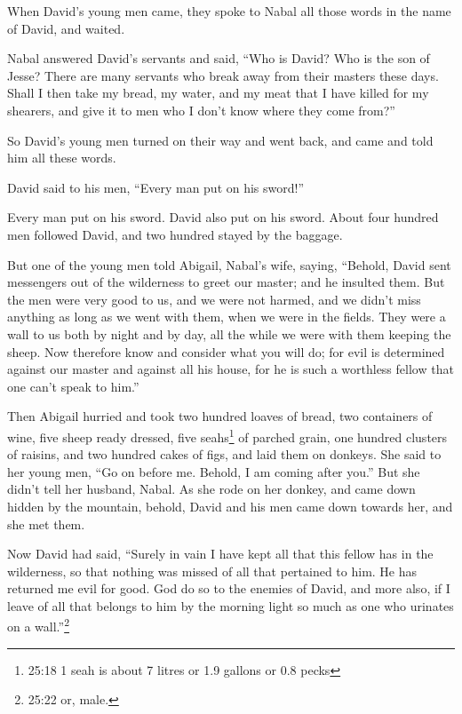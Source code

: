  When David's young men came, they spoke to Nabal all those
words in the name of David, and waited.

 Nabal answered David's servants and said, ``Who is David?
Who is the son of Jesse? There are many servants who break away from
their masters these days.  Shall I then take my bread, my
water, and my meat that I have killed for my shearers, and give it to
men who I don't know where they come from?''

 So David's young men turned on their way and went back,
and came and told him all these words.

 David said to his men, ``Every man put on his sword!''

Every man put on his sword. David also put on his sword. About four
hundred men followed David, and two hundred stayed by the baggage.

 But one of the young men told Abigail, Nabal's wife,
saying, ``Behold, David sent messengers out of the wilderness to greet
our master; and he insulted them.  But the men were very
good to us, and we were not harmed, and we didn't miss anything as long
as we went with them, when we were in the fields.  They
were a wall to us both by night and by day, all the while we were with
them keeping the sheep.  Now therefore know and consider
what you will do; for evil is determined against our master and against
all his house, for he is such a worthless fellow that one can't speak to
him.''

 Then Abigail hurried and took two hundred loaves of bread,
two containers of wine, five sheep ready dressed, five seahs\footnote{25:18
  1 seah is about 7 litres or 1.9 gallons or 0.8 pecks} of parched
grain, one hundred clusters of raisins, and two hundred cakes of figs,
and laid them on donkeys.  She said to her young men, ``Go
on before me. Behold, I am coming after you.'' But she didn't tell her
husband, Nabal.  As she rode on her donkey, and came down
hidden by the mountain, behold, David and his men came down towards her,
and she met them.

 Now David had said, ``Surely in vain I have kept all that
this fellow has in the wilderness, so that nothing was missed of all
that pertained to him. He has returned me evil for good. 
God do so to the enemies of David, and more also, if I leave of all that
belongs to him by the morning light so much as one who urinates on a
wall.''\footnote{25:22 or, male.}

